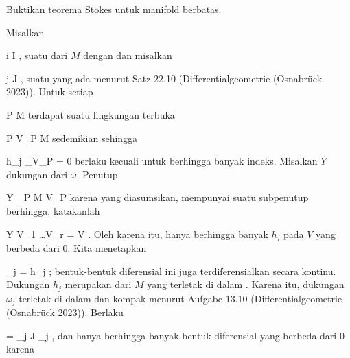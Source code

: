 {

Buktikan teorema Stokes untuk manifold berbatas.

}
{

\teilbeweis {}{}{}
{Misalkan

 {}
 {i \in I} {}
 {} {} {} {,}
suatu
dari $M$ dengan
dan misalkan

 {}
 {j \in J} {}
 {} {} {} {,}
suatu
yang ada menurut
Satz 22.10 (Differentialgeometrie (Osnabrück 2023)). Untuk setiap

\mavergleichskette
{\vergleichskette
{ P
}
{ \in }{ M
}
{  }{
}
{    }{
}
{   }{
}
}
{}{}{}
terdapat suatu lingkungan terbuka

\mavergleichskette
{\vergleichskette
{ P
}
{ \in }{ V_P
}
{ \subseteq }{ M
}
{    }{
}
{   }{
}
}
{}{}{}
sedemikian sehingga

\mavergleichskette
{\vergleichskette
{ h_j \vert_{V_P }
}
{ = }{ 0
}
{ }{
}
{ }{
}
{ }{
}
}
{}{}{}
berlaku kecuali untuk berhingga banyak indeks. Misalkan $Y$ dukungan dari $\omega$. Penutup

\mavergleichskette
{\vergleichskette
{ Y
}
{ \subseteq }{ \bigcup_{P \in M} V_P
}
{  }{
}
{    }{
}
{   }{
}
}
{}{}{}
karena
yang diasumsikan, mempunyai suatu subpenutup berhingga, katakanlah

\mavergleichskettedisp
{\vergleichskette
{ Y
}
{ \subseteq} { V_{1} \cup \ldots \cup V_{r}
}
{ =} { V
}
{ } {
}
{ } {
}
}
{}{}{.}
Oleh karena itu, hanya berhingga banyak $h_j$ pada $V$ yang berbeda dari $0$. Kita menetapkan

\mavergleichskette
{\vergleichskette
{ \omega_j
}
{ = }{ h_j \omega
}
{  }{
}
{    }{
}
{   }{
}
}
{}{}{;}
bentuk-bentuk diferensial ini juga terdiferensialkan secara kontinu. Dukungan $h_j$ merupakan
dari $M$ yang terletak di dalam
. Karena itu, dukungan $\omega_j$ terletak di dalam
 dan kompak menurut
Aufgabe 13.10 (Differentialgeometrie (Osnabrück 2023)).
Berlaku

\mavergleichskettedisp
{\vergleichskette
{ \omega
}
{ =} { \sum_{j \in J} \omega_j
}
{ } {
}
{ } {
}
{ } {
}
}
{}{}{,}
dan hanya berhingga banyak bentuk diferensial
 yang berbeda dari $0$ karena

}}
